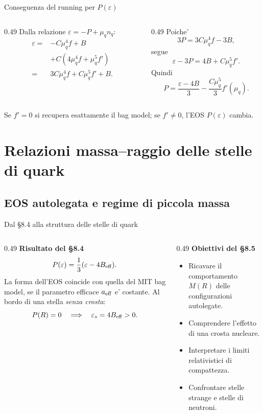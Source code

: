 \begin{frame}{Conseguenza del running per $P(\varepsilon)$}
\small
\begin{columns}[T,onlytextwidth]
\begin{column}{0.49\textwidth}
Dalla relazione $\varepsilon=-P+\mu_qn_q$:
\[
\begin{aligned}
\varepsilon
={}&-C\mu_q^4f+B\\
&+C\left(4\mu_q^4f+\mu_q^5f'\right)\\
={}&3C\mu_q^4f+C\mu_q^5f'+B.
\end{aligned}
\]
\end{column}
\begin{column}{0.49\textwidth}
Poiche'
\[
3P=3C\mu_q^4f-3B,
\]
segue
\[
\varepsilon-3P=4B+C\mu_q^5f'.
\]
Quindi
\[
P=\frac{\varepsilon-4B}{3}
-\frac{C\mu_q^5}{3}f'(\mu_q).
\]
\end{column}
\end{columns}
\medskip
Se $f'=0$ si recupera esattamente il bag model;
se $f'\ne0$, l'EOS $P(\varepsilon)$ cambia.
\end{frame}


\section{Relazioni massa--raggio delle stelle di quark}

\subsection{EOS autolegata e regime di piccola massa}

\begin{frame}{Dal \S8.4 alla struttura delle stelle di quark}
\small
\begin{columns}[T,onlytextwidth]
\begin{column}{0.49\textwidth}
\textbf{Risultato del \S8.4}
\[
P(\varepsilon)=\frac13(\varepsilon-4B_{\rm eff}).
\]
La forma dell'EOS coincide con quella del MIT bag model, se il parametro efficace $a_{\rm eff}$ e' costante.
\medskip
Al bordo di una stella \emph{senza crosta}:
\[
P(R)=0 \quad\Longrightarrow\quad
\varepsilon_s=4B_{\rm eff}>0.
\]
\end{column}
\begin{column}{0.49\textwidth}
\textbf{Obiettivi del \S8.5}
\begin{itemize}
\item Ricavare il comportamento $M(R)$ delle configurazioni autolegate.
\item Comprendere l'effetto di una crosta nucleare.
\item Interpretare i limiti relativistici di compattezza.
\item Confrontare stelle strange e stelle di neutroni.
\end{itemize}
\end{column}
\end{columns}
\end{frame}


